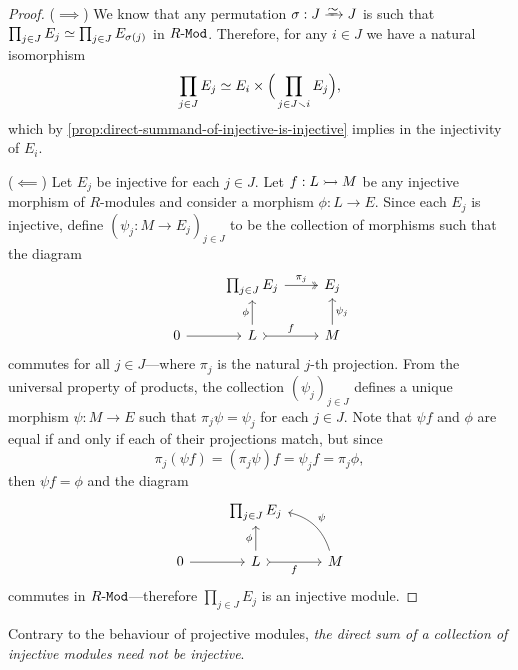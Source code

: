 \begin{proof}
    (\(\implies\)) We know that any permutation \(\sigma: J \isoto J\) is such that
    \(\prod_{j \in J} E_j \simeq \prod_{j \in J} E_{\sigma(j)}\) in \({R\text{-}\texttt{Mod}}\).
    Therefore, for any \(i \in J\) we have a natural isomorphism
    \[
        \prod_{j \in J} E_j \simeq E_i \times \Big( \prod_{j \in J \smallsetminus i} E_j \Big),
    \]
    which by \cref{prop:direct-summand-of-injective-is-injective} implies in the
    injectivity of \(E_i\).

    (\(\impliedby\)) Let \(E_j\) be injective for each \(j \in J\). Let
    \(f: L \rightarrowtail M\) be any injective morphism of \(R\)-modules and consider a
    morphism \(\phi: L \to E\). Since each \(E_j\) is injective, define
    \((\psi_j: M \to E_j)_{j \in J}\) to be the collection of morphisms such that
    the diagram
    \[
        \begin{tikzcd}
            &\prod_{j \in J} E_j \ar[r, two heads, "\pi_j"] & E_j
            \\
            0 \ar[r] &L \ar[u, "\phi"] \ar[r, tail, "f"] &M \ar[u, "\psi_j"']
        \end{tikzcd}
    \]
    commutes for all \(j \in J\)---where \(\pi_j\) is the natural \(j\)-th
    projection. From the universal property of products, the collection
    \((\psi_j)_{j \in J}\) defines a unique morphism \(\psi: M \to E\) such that
    \(\pi_j \psi = \psi_j\) for each \(j \in J\). Note that \(\psi f\) and \(\phi\)
    are equal if and only if each of their projections match, but since
    \[
        \pi_j(\psi f) = (\pi_j \psi) f = \psi_j f = \pi_j \phi,
    \]
    then \(\psi f = \phi\) and the diagram
    \[
        \begin{tikzcd}
            &\prod_{j \in J} E_j &
            \\
            0 \ar[r] &L \ar[u, "\phi"] \ar[r, tail, "f"'] &M \ar[lu, bend right, "\psi"']
        \end{tikzcd}
    \]
    commutes in \({R\text{-}\texttt{Mod}}\)---therefore \(\prod_{j \in J} E_j\) is an injective
    module.
\end{proof}

\begin{remark}
    \label{rem:direct-sum-injective-modules-not-always-injective}
    Contrary to the behaviour of projective modules, \emph{the direct sum of a
        collection of injective modules need not be injective}.
\end{remark}

